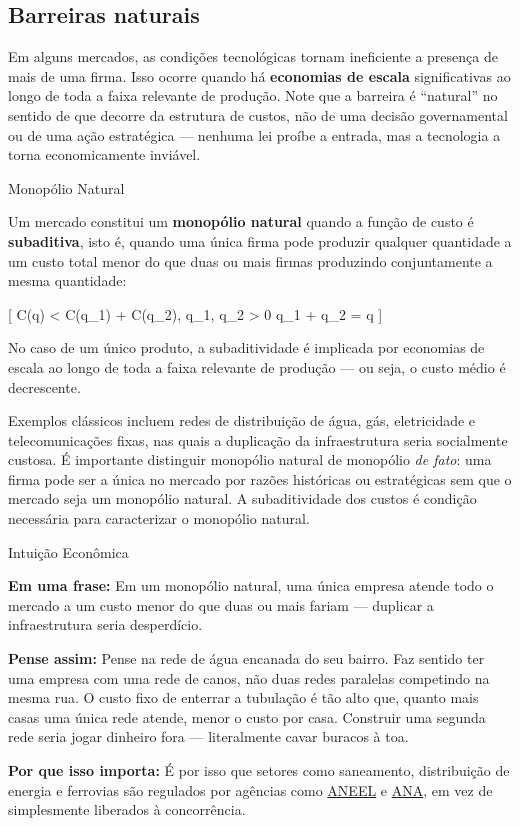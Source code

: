 \documentclass[11pt,twoside,openright]{book}
\begin{document}
\subsection{Barreiras naturais}\label{barreiras-naturais}

Em alguns mercados, as condições tecnológicas tornam ineficiente a
presença de mais de uma firma. Isso ocorre quando há \textbf{economias
de escala} significativas ao longo de toda a faixa relevante de
produção. Note que a barreira é ``natural'' no sentido de que decorre da
estrutura de custos, não de uma decisão governamental ou de uma ação
estratégica --- nenhuma lei proíbe a entrada, mas a tecnologia a torna
economicamente inviável.

\begin{definitionbox}{Monopólio Natural}

Um mercado constitui um \textbf{monopólio natural} quando a função de
custo é \textbf{subaditiva}, isto é, quando uma única firma pode
produzir qualquer quantidade a um custo total menor do que duas ou mais
firmas produzindo conjuntamente a mesma quantidade:

{[} C(q) \textless{} C(q\_1) + C(q\_2), \quad {} q\_1,
q\_2 \textgreater{} 0  q\_1 + q\_2 = q {]}

No caso de um único produto, a subaditividade é implicada por economias
de escala ao longo de toda a faixa relevante de produção --- ou seja, o
custo médio é decrescente.

\end{definitionbox}

Exemplos clássicos incluem redes de distribuição de água, gás,
eletricidade e telecomunicações fixas, nas quais a duplicação da
infraestrutura seria socialmente custosa. É importante distinguir
monopólio natural de monopólio \emph{de fato}: uma firma pode ser a
única no mercado por razões históricas ou estratégicas sem que o mercado
seja um monopólio natural. A subaditividade dos custos é condição
necessária para caracterizar o monopólio natural.

\begin{intuitionbox}{Intuição Econômica}

\textbf{Em uma frase:} Em um monopólio natural, uma única empresa atende
todo o mercado a um custo menor do que duas ou mais fariam --- duplicar
a infraestrutura seria desperdício.

\textbf{Pense assim:} Pense na rede de água encanada do seu bairro. Faz
sentido ter uma empresa com uma rede de canos, não duas redes paralelas
competindo na mesma rua. O custo fixo de enterrar a tubulação é tão alto
que, quanto mais casas uma única rede atende, menor o custo por casa.
Construir uma segunda rede seria jogar dinheiro fora --- literalmente
cavar buracos à toa.

\textbf{Por que isso importa:} É por isso que setores como saneamento,
distribuição de energia e ferrovias são regulados por agências como
\href{https://www.aneel.gov.br}{ANEEL} e
\href{https://www.gov.br/ana}{ANA}, em vez de simplesmente liberados à
concorrência.

\end{intuitionbox}
\end{document}
